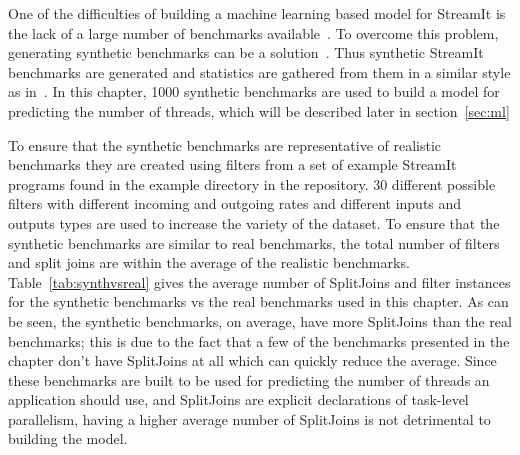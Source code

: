 One of the difficulties of building a machine learning based model for StreamIt is the lack of a large number of benchmarks available~\cite{wang2013partitionstreamit}.
To overcome this problem, generating synthetic benchmarks can be a solution~\cite{cumminsopencl2017}.
Thus synthetic StreamIt benchmarks are generated and statistics are gathered from them in a similar style as in~\cite{wang2013partitionstreamit}.
In this chapter, 1000 synthetic benchmarks are used to build a model for predicting the number of threads, which will be described later in section~\ref{sec:ml}

To ensure that the synthetic benchmarks are representative of realistic benchmarks they are created using filters from a set of example StreamIt programs found in the example directory in the repository.
30 different possible filters with different incoming and outgoing rates and different inputs and outputs types are used to increase the variety of the dataset.
To ensure that the synthetic benchmarks are similar to real benchmarks, the total number of filters and split joins are within the average of the realistic benchmarks.
Table~\ref{tab:synthvsreal} gives the average number of SplitJoins and filter instances for the synthetic benchmarks vs the real benchmarks used in this chapter.
As can be seen, the synthetic benchmarks, on average, have more SplitJoins than the real benchmarks; this is due to the fact that a few of the benchmarks presented in the chapter don't have SplitJoins at all which can quickly reduce the average.
Since these benchmarks are built to be used for predicting the number of threads an application should use, and SplitJoins are explicit declarations of task-level parallelism, having a higher average number of SplitJoins is not detrimental to building the model.
